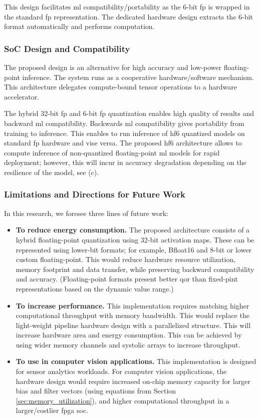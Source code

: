 This design facilitates \gls{ml} compatibility/portability as the 6-bit \gls{fp} is wrapped in the standard \gls{fp} representation. The dedicated hardware design extracts the 6-bit format automatically and performs computation.

\subsubsection{SoC Design and Compatibility}
The proposed design is an alternative for high accuracy and low-power floating-point inference. The system runs as a cooperative hardware/software mechanism. This architecture delegates compute-bound tensor operations to a hardware accelerator.

The hybrid 32-bit \gls{fp} and 6-bit \gls{fp} quantization enables high quality of results and backward \gls{ml} compatibility. Backwards \gls{ml} compatibility gives portability from training to inference. This enables to run inference of \gls{hf6} quantized models on standard \gls{fp} hardware and vise versa. The proposed \gls{hf6} architecture allows to compute inference of non-quantized floating-point \gls{ml} models for rapid deployment; however, this will incur in accuracy degradation depending on the resilience of the model, see (c).

\subsubsection{Limitations and Directions for Future Work}
In this research, we foresee three lines of future work:
\begin{itemize}
\item \textbf{To reduce energy consumption.} The proposed architecture consists of a hybrid floating-point quantization using 32-bit activation maps. These can be represented using lower-bit formats; for example, Bfloat16 and 8-bit or lower custom floating-point. This would reduce hardware resource utilization, memory footprint and data transfer, while preserving backward compatibility and accuracy. (Floating-point formats present better \gls{qor} than fixed-pint representations based on the dynamic value range.)

\item \textbf{To increase performance.} This implementation requires matching higher computational throughput with memory bandwidth. This would replace the light-weight pipeline hardware design with a parallelized structure. This will increase hardware area and energy consumption. This can be achieved by using wider memory channels and systolic arrays to increase throughput.

\item \textbf{To use in computer vision applications.} This implementation is designed for sensor analytics workloads. For computer vision applications, the hardware design would require increased on-chip memory capacity for larger bias and filter vectors (using equations from Section \ref{sec:memory_utilization}), and higher computational throughput in a larger/costlier \gls{fpga} \gls{soc}.
\end{itemize}

